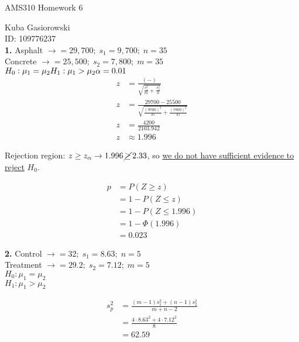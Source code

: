 \documentclass[12pt]{report}
\makeatletter
\newcommand*{\Xbar}{}%
\DeclareRobustCommand*{\Xbar}{%
	\mathpalette\@Xbar{}%
}
\newcommand*{\@Xbar}[2]{%
	\sbox0{$#1\mathrm{X}\m@th$}%
	\sbox2{$#1X\m@th$}%
	\rlap{%
		\hbox to\wd2{%
			\hfill
			$\overline{%
				\vrule width 0pt height\ht0 %
				\kern\wd0 %
			}$%
		}%
	}%
	\copy2 %
}
\newcommand*{\xbar}{}%
\DeclareRobustCommand*{\xbar}{%
	\mathpalette\@xbar{}%
}
\newcommand*{\@xbar}[2]{%
	\sbox0{$#1\mathrm{x}\m@th$}%
	\sbox2{$#1x\m@th$}%
	\rlap{%
		\hbox to\wd2{%
			\hfill
			$\overline{%
				\vrule width 0pt height\ht0 %
				\kern\wd0 %
			}$%
		}%
	}%
	\copy2 %
}
\newcommand*{\Ybar}{}%
\DeclareRobustCommand*{\Ybar}{%
	\mathpalette\@Ybar{}%
}
\newcommand*{\@Ybar}[2]{%
	\sbox0{$#1\mathrm{Y}\m@th$}%
	\sbox2{$#1Y\m@th$}%
	\rlap{%
		\hbox to\wd2{%
			\hfill
			$\overline{%
				\vrule width 0pt height\ht0 %
				\kern\wd0 %
			}$%
		}%
	}%
	\copy2 %
}
\newcommand*{\ybar}{}%
\DeclareRobustCommand*{\ybar}{%
	\mathpalette\@ybar{}%
}
\newcommand*{\@ybar}[2]{%
	\sbox0{$#1\mathrm{y}\m@th$}%
	\sbox2{$#1y\m@th$}%
	\rlap{%
		\hbox to\wd2{%
			\hfill
			$\overline{%
				\vrule width 0pt height\ht0 %
				\kern\wd0 %
			}$%
		}%
	}%
	\copy2 %
}
\makeatother
\begin{document}
\Large
\centering
AMS310 Homework 6

\justify
\normalsize

Kuba Gasiorowski\\
ID: 109776237\\

\noindent \textbf{1.} Asphalt $ \rightarrow \Xbar = 29,700;\;s_1 = 9,700;\;n=35$\\
Concrete $ \rightarrow \Ybar = 25,500;\;s_2 = 7,800;\;m=35$\\

\noindent $H_0: \mu_1 = \mu_2\\
H_1: \mu_1 > \mu_2\\\\
\alpha = 0.01$
\begin{align*}
	z &= \frac{(\xbar - \ybar)}{\sqrt{\frac{s_1^2}{m} + \frac{s_2^2}{n}}}\\
	z &= \frac{29700 - 25500}{\sqrt{\frac{(9700)^2}{35} + \frac{(7800)^2}{35}}}\\
	z &= \frac{4200}{2103.942}\\
	z &\approx 1.996
\end{align*}

\noindent Rejection region: $z \geq z_\alpha \rightarrow 1.996 \,\cancel{\geq}\, 2.33$, so \underline{we do not have sufficient evidence to reject} $H_0$.

\begin{align*}
	p &= P(Z \geq z)\\
	&= 1 - P(Z \leq z)\\
	&= 1 - P(Z \leq 1.996)\\
	&= 1 - \Phi(1.996)\\
	&= \boxed{0.023}
\end{align*}

\pagebreak

\noindent \textbf{2.} Control $\rightarrow \Xbar = 32;\; s_1 = 8.63;\;n=5$\\
Treatment $\rightarrow \Ybar = 29.2;\; s_2 = 7.12;\;m=5$\\

\noindent $H_0: \mu_1 = \mu_2$\\
$H_1: \mu_1 > \mu_2$

\begin{align*}
	s_p^2 &= \frac{(m-1)s_1^2 + (n-1)s_2^2}{m+n-2}\\
	&= \frac{4 \cdot 8.63^2 + 4 \cdot 7.12^2}{8}\\
	&= 62.59
\end{align*}
\end{document}
